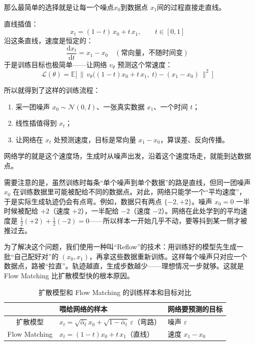 那么最简单的选择就是让每一个噪点$x_0$到数据点 $x_1$间的过程直接走直线。

直线插值：
\begin{equation}
\boxed{\; x_t = (1-t)\,x_0 + t\,x_1, \qquad t \in [0,1] \;}
\end{equation}
沿这条直线，速度是恒定的：
\begin{equation}
\frac{\mathrm{d}x_t}{\mathrm{d}t} = x_1 - x_0 \quad(\text{常向量，不随时间变})
\end{equation}
于是训练目标也极简单——让网络 $v_\theta$ 预测这个常速度：
\begin{equation}\label{eq:flow_loss}
\boxed{\;\mathcal{L}(\theta) = \mathbb{E}\Big[\,\big\|\,v_\theta\big((1-t)x_0 + t\,x_1,\; t\big) - (x_1 - x_0)\,\big\|^2\,\Big]\;}
\end{equation}

所以就得到了这样的训练流程：
\begin{enumerate}
    \item 采一团噪声 $x_0 \sim \mathcal{N}(0,I)$、一张真实数据 $x_1$、一个时间 $t$；
    \item 线性插值得到 $x_t$；
    \item 让网络在 $x_t$ 处预测速度，目标是常向量 $x_1 - x_0$，算误差、反向传播。
\end{enumerate}
网络学的就是这个速度场，生成时从噪声出发，沿着这个速度场走，就能到达数据点。

需要注意的是，虽然训练时每条“单个噪声到单个数据”的路是直线，但同一团噪声 $x_0$ 在训练数据里可能被配给不同的数据点。对此，网络只能学一个“平均速度”，于是实际生成轨迹仍会有点弯。例如，数据只有两点 $\{-2, +2\}$。噪声 $x_0 = 0$ 一半时候被配给 $+2$（速度 $+2$），一半配给 $-2$（速度 $-2$）。网络在此处学到的平均速度是 $\tfrac{1}{2}(+2) + \tfrac{1}{2}(-2) = 0$——所以样本一开始几乎不动，要等抖到某一侧才被推过去。

为了解决这个问题，我们使用一种叫“Reflow”的技术：用训练好的模型先生成一批“自己配好对”的 $(x_0, x_1)$，再拿这些数据重新训练。这样每个噪声只对应一个数据点，路被“拉直”。轨迹越直，生成步数越少——理想情况一步就够。这就是 Flow Matching 比扩散模型快的根本原因。

\begin{table}[h]
\centering
\begin{tabular}{c|ll}
\toprule
& \textbf{喂给网络的样本} & \textbf{网络要预测的目标} \\
\midrule
扩散模型 & $x_t = \sqrt{\bar\alpha_t}x_0 + \sqrt{1-\bar\alpha_t}\,\varepsilon$（弯路） & 噪声 $\varepsilon$ \\
Flow Matching & $x_t = (1-t)x_0 + t\,x_1$（直线） & 速度 $x_1 - x_0$ \\
\bottomrule
\end{tabular}
\caption{扩散模型和 Flow Matching 的训练样本和目标对比}
\end{table}


